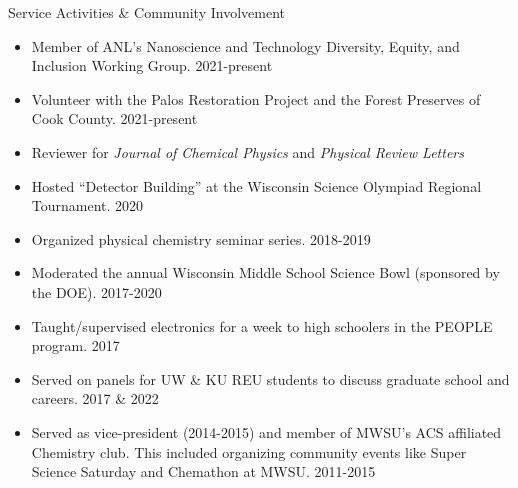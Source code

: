 \documentclass{resume} %
\begin{document}
\iffalse
\begin{rSection}{Teaching Experience}
	
	\begin{rSubsectionlistless}{Physical Chemistry: Thermodynamics}{Fall 2016}{Teaching Assistant for Prof. Gilbert M. Nathanson }{Madison, WI}
	\end{rSubsectionlistless}
	
	\begin{rSubsectionlistless}{General Chemistry}{Fall 2015 - spring 2016}{Teaching Assistant for Prof. Ive Herman and Dr. Paul Hooker}{Madison, WI}
	\end{rSubsectionlistless}
	
	\begin{rSubsectionlistless}{Organic Chemistry II}{Fall 2013}{Teaching Assistant for Prof. Steven P. Lorimor}{Saint Joseph, MO}
	\end{rSubsectionlistless}
	
\end{rSection}
\fi

\begin{rSection}{Service Activities \& Community Involvement}
	
	\begin{itemize}[leftmargin = 0 pt]
		\item Member of ANL's Nanoscience and Technology
		Diversity, Equity, and Inclusion Working Group. 2021-present 
		\item Volunteer with the Palos Restoration Project and the Forest Preserves of Cook County. 2021-present
		\item Reviewer for \emph{Journal of Chemical Physics} and \emph{Physical Review Letters}
		\item Hosted ``Detector Building'' at the Wisconsin Science Olympiad Regional Tournament. 2020
		\item Organized physical chemistry seminar series. 2018-2019
		\item Moderated the annual Wisconsin Middle School Science Bowl (sponsored by the DOE). 2017-2020
		\item Taught/supervised electronics for a week to high schoolers in the PEOPLE program. 2017
		\item Served on panels for UW \& KU REU students to discuss graduate school and careers. 2017 \& 2022 
		\item Served as vice-president (2014-2015) and member of MWSU's ACS affiliated Chemistry club. This included organizing community events like Super Science Saturday and Chemathon at MWSU. 2011-2015
	\end{itemize}
\end{rSection}
\end{document}
